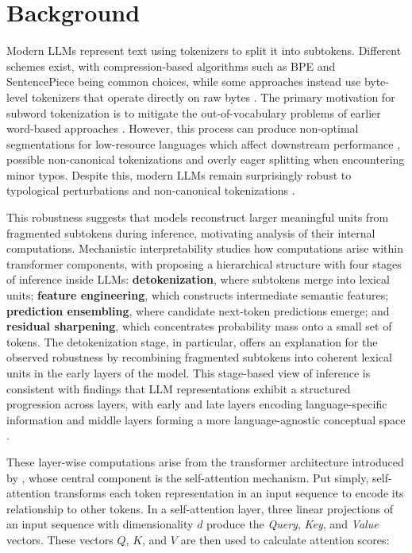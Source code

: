\documentclass[11pt]{article}
\begin{document}
\section{Background}
Modern LLMs represent text using tokenizers to split it into subtokens. Different schemes exist, with compression-based algorithms such as BPE \citep{sennrich2016} and SentencePiece \citep{kudo2018} being common choices, while some approaches instead use byte-level tokenizers that operate directly on raw bytes \citep{xue2022}. The primary motivation for subword tokenization is to mitigate the out-of-vocabulary problems of earlier word-based approaches \citep{mielke2021}. However, this process can produce non-optimal segmentations for low-resource languages which affect downstream performance \citep{ahia2023}, possible non-canonical tokenizations and overly eager splitting when encountering minor typos. Despite this, modern LLMs remain surprisingly robust to typological perturbations \citep{cao2023} and non-canonical tokenizations \citep{gutierrez2023, zheng2026}.

This robustness suggests that models reconstruct larger meaningful units from fragmented subtokens during inference, motivating analysis of their internal computations. Mechanistic interpretability studies how computations arise within transformer components, with \citet{lad2024} proposing a hierarchical structure with four stages of inference inside LLMs: \textbf{detokenization}, where subtokens merge into lexical units; \textbf{feature engineering}, which constructs intermediate semantic features; \textbf{prediction ensembling}, where candidate next-token predictions emerge; and \textbf{residual sharpening}, which concentrates probability mass onto a small set of tokens. The detokenization stage, in particular, offers an explanation for the observed robustness by recombining fragmented subtokens into coherent lexical units in the early layers of the model. This stage-based view of inference is consistent with findings that LLM representations exhibit a structured progression across layers, with early and late layers encoding language-specific information and middle layers forming a more language-agnostic conceptual space \citep{wendler2024, conneau2020}.

These layer-wise computations arise from the transformer architecture introduced by \citet{vaswani2017}, whose central component is the self-attention mechanism. Put simply, self-attention transforms each token representation in an input sequence to encode its relationship to other tokens. In a self-attention layer, three linear projections of an input sequence with dimensionality $d$ produce the \textit{Query}, \textit{Key}, and \textit{Value} vectors. These vectors $Q$, $K$, and $V$ are then used to calculate attention scores:
\end{document}
